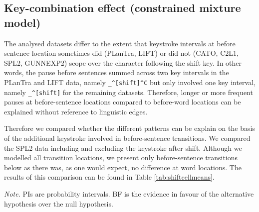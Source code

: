 \documentclass[
  english,
  man,floatsintext]{apa7}
\begin{document}
\begin{appendix}
\section{}
\hypertarget{key-combination-effect-constrained-mixture-model}{%
\subsection{Key-combination effect (constrained mixture
model)}\label{key-combination-effect-constrained-mixture-model}}

The analysed datasets differ to the extent that keystroke intervals at
before sentence location sometimes did (PLanTra, LIFT) or did not (CATO,
C2L1, SPL2, GUNNEXP2) scope over the character following the shift key.
In other words, the pause before sentences summed across two key
intervals in the PLanTra and LIFT data, namely
\texttt{\_\^{}{[}shift{]}\^{}C} but only involved one key interval,
namely \texttt{\_\^{}{[}shift{]}} for the remaining datasets. Therefore,
longer or more frequent pauses at before-sentence locations compared to
before-word locations can be explained without reference to linguistic
edges.

Therefore we compared whether the different patterns can be explain on
the basis of the additional keystroke involved in before-sentence
transitions. We compared the SPL2 data including and excluding the
keystroke after shift. Although we modelled all transition locations, we
present only before-sentence transitions below as there was, as one
would expect, no difference at word locations. The results of this
comparison can be found in Table \ref{tab:shiftcellmeans}.

\begin{center}
\begin{ThreePartTable}

\begin{TableNotes}[para]
\normalsize{\textit{Note.} PIs are probability intervals. BF is the evidence in favour of the alternative hypothesis over the null hypothesis.}
\end{TableNotes}

\footnotesize{

}
\end{ThreePartTable}
\end{center}
\end{appendix}
\end{document}
